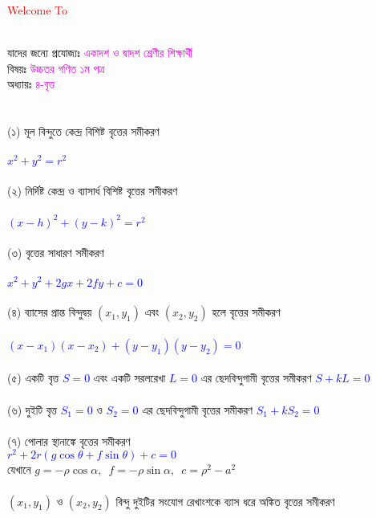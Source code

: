 \documentclass{article}
\begin{document}
 
	\Large
	\textcolor{red}{Welcome To} 
	\\
	\\
	যাদের জন্যে প্রযোজ্যঃ  	\textcolor{magenta}{একাদশ ও দ্বাদশ শ্রেণীর শিক্ষার্থী} \\
	বিষয়ঃ \textcolor{magenta}{উচ্চতর গণিত ১ম পত্র} \\
	অধ্যায়ঃ \textcolor{magenta}{৪-বৃত্ত}\\ 
	\\
	\\
	(১)  মূল বিন্দুতে কেন্দ্র বিশিষ্ট বৃত্তের সমীকরণ  \\
	\\
	\textcolor{blue}{$x^2+y^2=r^2$}\\
	\\
	(২) নির্দিষ্ট কেন্দ্র ও ব্যাসার্ধ বিশিষ্ট বৃত্তের  সমীকরণ \\
	\\
	\textcolor{blue}{$(x-h)^2+(y-k)^2=r^2$}\\
	\\
	(৩) বৃত্তের সাধারণ সমীকরণ\\
	\\  
	\textcolor{blue}{$x^2+y^2+2gx+2fy+c=0$}\\
	\\
	(৪) ব্যাসের প্রান্ত বিন্দুদ্বয় $(x_1,y_1)$ এবং $(x_2,y_2)$ হলে বৃত্তের সমীকরণ\\
	\\ 
	\textcolor{blue}{$(x-x_1)(x-x_2)+(y-y_1)(y-y_2)=0$}\\
	\\
	(৫) একটি বৃত্ত \textcolor{blue}{$S=0$ }এবং একটি সরলরেখা \textcolor{blue}{$L=0$}  এর ছেদবিন্দুগামী বৃত্তের সমীকরণ  \textcolor{blue}{$S+kL=0$} \\
	\\
	(৬) দুইটি বৃত্ত \textcolor{blue}{$S_1=0$} ও \textcolor{blue}{$S_2=0$} এর ছেদবিন্দুগামী বৃত্তের সমীকরণ \textcolor{blue}{$S_1+kS_2=0$}\\  \\
	(৭) পোলার স্থানাঙ্কে বৃত্তের  সমীকরণ \\
	\textcolor{blue}{$r^2+2r(g\cos \theta+f\sin \theta )+c=0$}\\
যেখানে 	$g=-\rho \cos \alpha,\,\,\,f=-\rho \sin \alpha,\,\,\,c=\rho^2-a^2 $\\
	\\ 
	$(x_1,y_1)$ ও $(x_2,y_2)$ বিন্দু দুইটির সংযোগ রেখাংশকে ব্যাস ধরে অঙ্কিত বৃত্তের সমীকরণ \\
\end{document}
